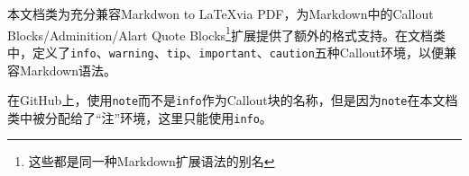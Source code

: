 本文档类为充分兼容Markdwon to \LaTeX via PDF，为Markdown中的Callout Blocks/Adminition/Alart Quote Blocks\footnote{这些都是同一种Markdown扩展语法的别名}扩展提供了额外的格式支持。在文档类中，定义了\texttt{info}、\texttt{warning}、\texttt{tip}、\texttt{important}、\texttt{caution}五种Callout环境，以便兼容Markdown语法。

\begin{important}
  在GitHub上，使用\texttt{note}而不是\texttt{info}作为Callout块的名称，但是因为\texttt{note}在本文档类中被分配给了“注”环境，这里只能使用\texttt{info}。
\end{important}